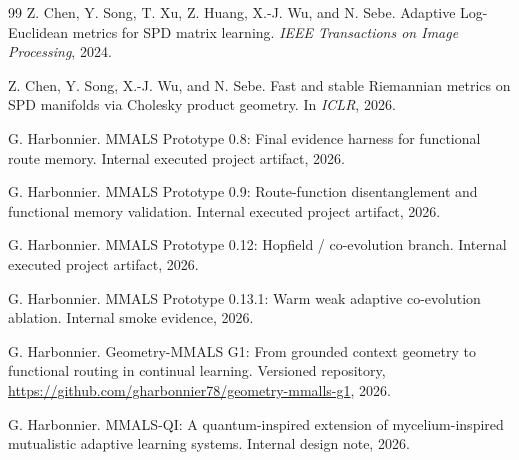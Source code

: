 \begin{thebibliography}{99}
Z. Chen, Y. Song, T. Xu, Z. Huang, X.-J. Wu, and N. Sebe.
\newblock Adaptive Log-Euclidean metrics for SPD matrix learning.
\newblock \emph{IEEE Transactions on Image Processing}, 2024.

Z. Chen, Y. Song, X.-J. Wu, and N. Sebe.
\newblock Fast and stable Riemannian metrics on SPD manifolds via Cholesky product geometry.
\newblock In \emph{ICLR}, 2026.

G. Harbonnier.
\newblock MMALS Prototype 0.8: Final evidence harness for functional route memory.
\newblock Internal executed project artifact, 2026.

G. Harbonnier.
\newblock MMALS Prototype 0.9: Route-function disentanglement and functional memory validation.
\newblock Internal executed project artifact, 2026.

G. Harbonnier.
\newblock MMALS Prototype 0.12: Hopfield / co-evolution branch.
\newblock Internal executed project artifact, 2026.

G. Harbonnier.
\newblock MMALS Prototype 0.13.1: Warm weak adaptive co-evolution ablation.
\newblock Internal smoke evidence, 2026.

G. Harbonnier.
\newblock Geometry-MMALS G1: From grounded context geometry to functional routing in continual learning.
\newblock Versioned repository, \url{https://github.com/gharbonnier78/geometry-mmalls-g1}, 2026.

G. Harbonnier.
\newblock MMALS-QI: A quantum-inspired extension of mycelium-inspired mutualistic adaptive learning systems.
\newblock Internal design note, 2026.

\end{thebibliography}

